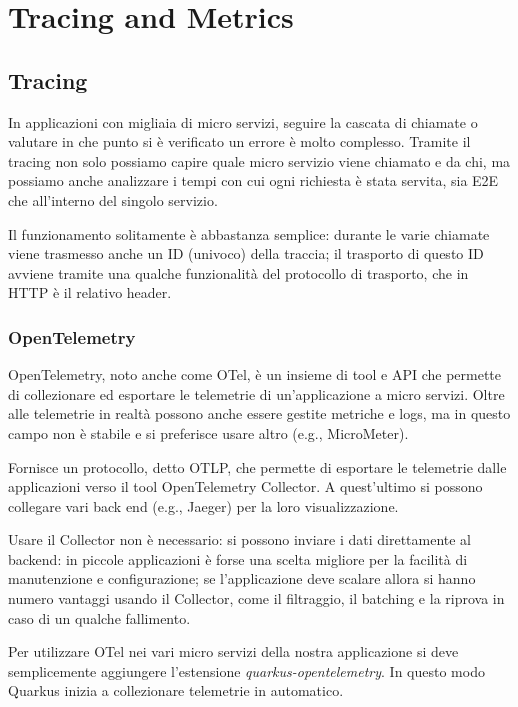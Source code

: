 \chapter{Tracing and Metrics}
\label{cap:tracing-metrics}

\section{Tracing}
\label{cap:tracing}
In applicazioni con migliaia di micro servizi, seguire la cascata di chiamate o valutare in che punto si è verificato un errore è molto complesso. Tramite il tracing non solo possiamo capire quale micro servizio viene chiamato e da chi, ma possiamo anche analizzare i tempi con cui ogni richiesta è stata servita, sia E2E che all'interno del singolo servizio.

Il funzionamento solitamente è abbastanza semplice: durante le varie chiamate viene trasmesso anche un ID (univoco) della traccia; il trasporto di questo ID avviene tramite una qualche funzionalità del protocollo di trasporto, che in HTTP è il relativo header.

\subsection{OpenTelemetry}
OpenTelemetry, noto anche come OTel, è un insieme di tool e API che permette di collezionare ed esportare le telemetrie di un'applicazione a micro servizi. Oltre alle telemetrie in realtà possono anche essere gestite metriche e logs, ma in questo campo non è stabile e si preferisce usare altro (e.g., MicroMeter).

\myskip

Fornisce un protocollo, detto OTLP, che permette di esportare le telemetrie dalle applicazioni verso il tool OpenTelemetry Collector. A quest'ultimo si possono collegare vari back end (e.g., Jaeger) per la loro visualizzazione.

Usare il Collector non è necessario: si possono inviare i dati direttamente al backend: in piccole applicazioni è forse una scelta migliore per la facilità di manutenzione e configurazione; se l'applicazione deve scalare allora si hanno numero vantaggi usando il Collector, come il filtraggio, il batching e la riprova in caso di un qualche fallimento.

\myskip

Per utilizzare OTel nei vari micro servizi della nostra applicazione si deve semplicemente aggiungere l'estensione \textit{quarkus-opentelemetry}. In questo modo Quarkus inizia a collezionare telemetrie in automatico.

